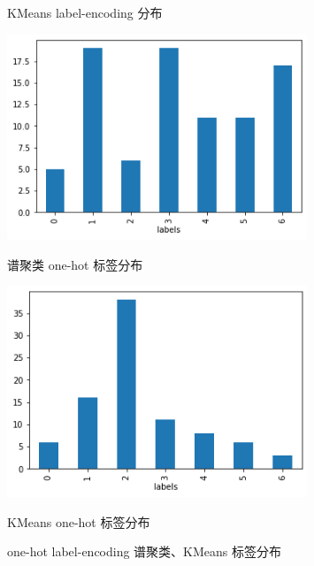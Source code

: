 \begin{figure}[htb]
\begin{minipage}[htb]{0.4\linewidth}
        \caption{KMeans label-encoding 分布}
    \end{minipage}
    \begin{minipage}[htb]{0.4\linewidth}
        \includegraphics[width=0.8\textwidth]{images/Spectral-clustering-label-result-one-hot.png}
        \caption{谱聚类 one-hot 标签分布}
    \end{minipage}
    \begin{minipage}[htb]{0.4\linewidth}
        \includegraphics[width=0.8\textwidth]{images/KMeans-label-result-one-hot.png}
        \caption{KMeans one-hot 标签分布}
    \end{minipage}
    \caption{one-hot label-encoding 谱聚类、KMeans 标签分布}\label{one-hot-label-encoding-clustering-label-result} %
\end{figure}

